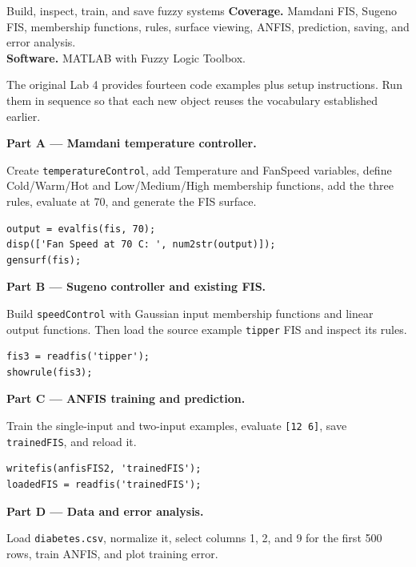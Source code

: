 
\begin{labproject}{Build, inspect, train, and save fuzzy systems}
\textbf{Coverage.} Mamdani FIS, Sugeno FIS, membership functions, rules, surface viewing, ANFIS, prediction, saving, and error analysis.\\
\textbf{Software.} MATLAB with Fuzzy Logic Toolbox.

\begin{labmode}
The original Lab 4 provides fourteen code examples plus setup instructions. Run them in sequence so that each new object reuses the vocabulary established earlier.
\end{labmode}

\medskip\noindent\textbf{Part A --- Mamdani temperature controller.}\par
Create \texttt{temperatureControl}, add Temperature and FanSpeed variables, define Cold/Warm/Hot and Low/Medium/High membership functions, add the three rules, evaluate at 70, and generate the FIS surface.

\begin{lstlisting}[style=mlmatlab]
output = evalfis(fis, 70);
disp(['Fan Speed at 70 C: ', num2str(output)]);
gensurf(fis);
\end{lstlisting}

\medskip\noindent\textbf{Part B --- Sugeno controller and existing FIS.}\par
Build \texttt{speedControl} with Gaussian input membership functions and linear output functions. Then load the source example \texttt{tipper} FIS and inspect its rules.

\begin{lstlisting}[style=mlmatlab]
fis3 = readfis('tipper');
showrule(fis3);
\end{lstlisting}

\medskip\noindent\textbf{Part C --- ANFIS training and prediction.}\par
Train the single-input and two-input examples, evaluate \texttt{[12 6]}, save \texttt{trainedFIS}, and reload it.

\begin{lstlisting}[style=mlmatlab]
writefis(anfisFIS2, 'trainedFIS');
loadedFIS = readfis('trainedFIS');
\end{lstlisting}

\medskip\noindent\textbf{Part D --- Data and error analysis.}\par
Load \texttt{diabetes.csv}, normalize it, select columns 1, 2, and 9 for the first 500 rows, train ANFIS, and plot training error.


\end{labproject}
